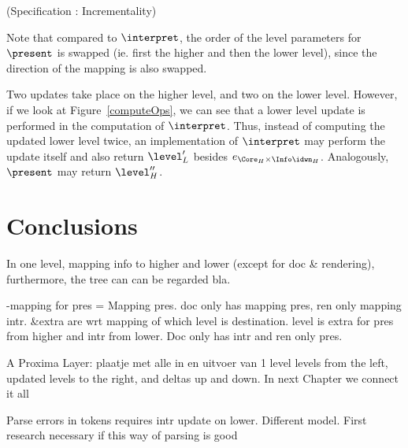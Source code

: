 \begin{center}(Specification \thespecification: Incrementality)\end{center}\vspace{1em}

Note that compared to $\interpret$, the order of the level parameters for 
$\present$ is swapped (ie. first the higher and then the lower level), since the direction of the mapping is also swapped. 

Two updates take place on the higher level, and two on the lower level. However, if we look at Figure~\ref{computeOps}, we can see that a lower level update is performed in the computation of
 $\interpret$. Thus, instead of computing the updated lower level twice, an implementation of 
 $\interpret$ may perform the update itself and also return $\level'_{L}$ besides
 $e_{\Core_{H} \times \Info\idwn_{H}}$.  Analogously, $\present$ may return $\level''_{H}$. 
 



%																
\section{Conclusions}

\toHere     %

In one level,  mapping info to higher and lower (except for doc \& rendering), furthermore, the tree can can be regarded bla.

-mapping for pres = Mapping pres. doc only has mapping pres, ren only mapping intr. \Core \&extra are wrt mapping of which level is destination. level is extra for pres from higher and intr from lower. Doc only has intr  and ren only pres.

A Proxima Layer:
plaatje met alle in en uitvoer van 1 level
levels from the left, updated levels to the right, and deltas up and down. In next Chapter we connect it all


Parse errors in tokens requires intr update on lower. Different model. First research necessary if this way of parsing is good



